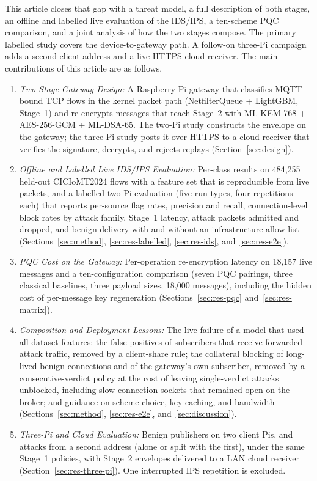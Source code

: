 \documentclass[journal]{IEEEtran}
\begin{document}
This article closes that gap with a threat model, a full description of both stages, an offline and labelled live evaluation of the IDS/IPS, a ten-scheme PQC comparison, and a joint analysis of how the two stages compose. The primary labelled study covers the device-to-gateway path. A follow-on three-Pi campaign adds a second client address and a live HTTPS cloud receiver. The main contributions of this article are as follows.
\begin{enumerate}
  \item \textit{Two-Stage Gateway Design:} A Raspberry Pi gateway that classifies MQTT-bound TCP flows in the kernel packet path (NetfilterQueue + LightGBM, Stage~1) and re-encrypts messages that reach Stage~2 with ML-KEM-768 + AES-256-GCM + ML-DSA-65. The two-Pi study constructs the envelope on the gateway; the three-Pi study posts it over HTTPS to a cloud receiver that verifies the signature, decrypts, and rejects replays (Section~\ref{sec:design}).
  \item \textit{Offline and Labelled Live IDS/IPS Evaluation:} Per-class results on 484,255 held-out CICIoMT2024 flows with a feature set that is reproducible from live packets, and a labelled two-Pi evaluation (five run types, four repetitions each) that reports per-source flag rates, precision and recall, connection-level block rates by attack family, Stage~1 latency, attack packets admitted and dropped, and benign delivery with and without an infrastructure allow-list (Sections~\ref{sec:method}, \ref{sec:res-labelled}, \ref{sec:res-ids}, and~\ref{sec:res-e2e}).
  \item \textit{PQC Cost on the Gateway:} Per-operation re-encryption latency on 18,157 live messages and a ten-configuration comparison (seven PQC pairings, three classical baselines, three payload sizes, 18,000 messages), including the hidden cost of per-message key regeneration (Sections~\ref{sec:res-pqc} and~\ref{sec:res-matrix}).
  \item \textit{Composition and Deployment Lessons:} The live failure of a model that used all dataset features; the false positives of subscribers that receive forwarded attack traffic, removed by a client-share rule; the collateral blocking of long-lived benign connections and of the gateway's own subscriber, removed by a consecutive-verdict policy at the cost of leaving single-verdict attacks unblocked, including slow-connection sockets that remained open on the broker; and guidance on scheme choice, key caching, and bandwidth (Sections~\ref{sec:method}, \ref{sec:res-e2e}, and~\ref{sec:discussion}).
  \item \textit{Three-Pi and Cloud Evaluation:} Benign publishers on two client Pis, and attacks from a second address (alone or split with the first), under the same Stage~1 policies, with Stage~2 envelopes delivered to a LAN cloud receiver (Section~\ref{sec:res-three-pi}). One interrupted IPS repetition is excluded.
\end{enumerate}
\end{document}
